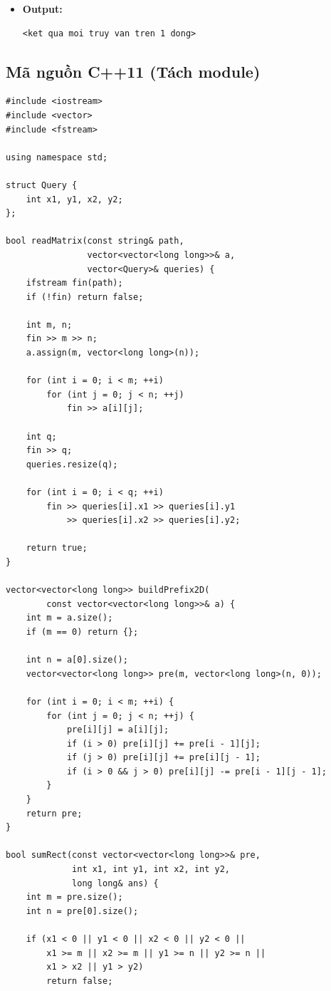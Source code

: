 \begin{itemize}
    \item \textbf{Output:}
    \begin{lstlisting}
<ket qua moi truy van tren 1 dong>
    \end{lstlisting}
\end{itemize}

\subsection{Mã nguồn C++11 (Tách module)}
\begin{lstlisting}
#include <iostream>
#include <vector>
#include <fstream>

using namespace std;

struct Query {
    int x1, y1, x2, y2;
};

bool readMatrix(const string& path,
                vector<vector<long long>>& a,
                vector<Query>& queries) {
    ifstream fin(path);
    if (!fin) return false;

    int m, n;
    fin >> m >> n;
    a.assign(m, vector<long long>(n));

    for (int i = 0; i < m; ++i)
        for (int j = 0; j < n; ++j)
            fin >> a[i][j];

    int q;
    fin >> q;
    queries.resize(q);

    for (int i = 0; i < q; ++i)
        fin >> queries[i].x1 >> queries[i].y1
            >> queries[i].x2 >> queries[i].y2;

    return true;
}

vector<vector<long long>> buildPrefix2D(
        const vector<vector<long long>>& a) {
    int m = a.size();
    if (m == 0) return {};

    int n = a[0].size();
    vector<vector<long long>> pre(m, vector<long long>(n, 0));

    for (int i = 0; i < m; ++i) {
        for (int j = 0; j < n; ++j) {
            pre[i][j] = a[i][j];
            if (i > 0) pre[i][j] += pre[i - 1][j];
            if (j > 0) pre[i][j] += pre[i][j - 1];
            if (i > 0 && j > 0) pre[i][j] -= pre[i - 1][j - 1];
        }
    }
    return pre;
}

bool sumRect(const vector<vector<long long>>& pre,
             int x1, int y1, int x2, int y2,
             long long& ans) {
    int m = pre.size();
    int n = pre[0].size();

    if (x1 < 0 || y1 < 0 || x2 < 0 || y2 < 0 ||
        x1 >= m || x2 >= m || y1 >= n || y2 >= n ||
        x1 > x2 || y1 > y2)
        return false;


\end{lstlisting}
